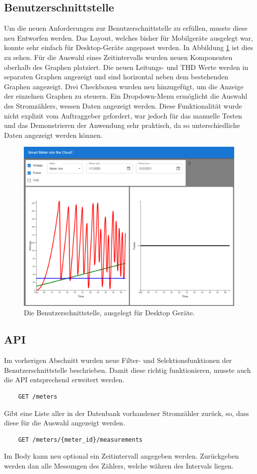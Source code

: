 \subsection{Benutzerschnittstelle}
Um die neuen Anforderungen zur Benutzerschnittstelle zu erfüllen, musste diese neu Entworfen werden.
Das Layout, welches bisher für Mobilgeräte ausgelegt war, konnte sehr einfach für Desktop-Geräte angepasst werden.
In Abbildung \ref{fig:phase2-ui} ist dies zu sehen.
Für die Auswahl eines Zeitintervalls wurden neuen Komponenten oberhalb des Graphen platziert.
Die neuen Leitungs- und \ac{THD} Werte werden in separaten Graphen angezeigt und sind horizontal neben dem bestehenden Graphen angezeigt.
Drei Checkboxen wurden neu hinzugefügt, um die Anzeige der einzelnen Graphen zu steuern.
Ein Dropdown-Menu ermöglicht die Auswahl des Stromzählers, wessen Daten angezeigt werden.
Diese Funktionalität wurde nicht explizit vom Auftraggeber gefordert, war jedoch für das manuelle Testen
und das Demonstrieren der Anwendung sehr praktisch, da so unterschiedliche Daten angezeigt werden können.
\begin{figure}[H]
    \centering
    \includegraphics[width=1.0\textwidth]{gfx/phase2}
    \caption{
        Die Benutzerschnittstelle, ausgelegt für Desktop Geräte.
    }
    \label{fig:phase2-ui}
\end{figure}
\subsection{\ac{API}}
Im vorherigen Abschnitt wurden neue Filter- und Selektionsfunktionen der Benutzerschnittstelle beschrieben.
Damit diese richtig funktionieren, musste auch die \ac{API} entsprechend erweitert werden.
\begin{verbatim}
    GET /meters
\end{verbatim}
Gibt eine Liste aller in der Datenbank vorhandener Stromzähler zurück, so, dass diese für die Auswahl angezeigt werden.
\begin{verbatim}
    GET /meters/{meter_id}/measurements
\end{verbatim}
Im Body kann neu optional ein Zeitintervall angegeben werden.
Zurückgeben werden dan alle Messungen des Zählers, welche währen des Intervals liegen.



